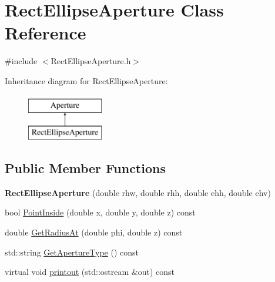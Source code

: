 \hypertarget{classRectEllipseAperture}{}\section{Rect\+Ellipse\+Aperture Class Reference}
\label{classRectEllipseAperture}


{\ttfamily \#include $<$Rect\+Ellipse\+Aperture.\+h$>$}

Inheritance diagram for Rect\+Ellipse\+Aperture\+:\begin{figure}[H]
\begin{center}
\leavevmode
\includegraphics[height=2.000000cm]{classRectEllipseAperture}
\end{center}
\end{figure}
\subsection*{Public Member Functions}
\begin{DoxyCompactItemize}
\item 
\mbox{\label{classRectEllipseAperture_a806557895c0a3df2e4e6e5e6aa577c19}} 
{\bfseries Rect\+Ellipse\+Aperture} (double rhw, double rhh, double ehh, double ehv)
\item 
bool \hyperlink{classRectEllipseAperture_ac3cc7fae775b055d74ea185a77b08c7f}{Point\+Inside} (double x, double y, double z) const
\item 
double \hyperlink{classRectEllipseAperture_a3e6ea0e15b7a9f026bc7ead70efe5e18}{Get\+Radius\+At} (double phi, double z) const
\item 
std\+::string \hyperlink{classRectEllipseAperture_a983dec943872b82aa91f74cd10558207}{Get\+Aperture\+Type} () const
\item 
virtual void \hyperlink{classRectEllipseAperture_a13285bdfb9c849fe94cd261ae1bfffe4}{printout} (std\+::ostream \&out) const
\end{DoxyCompactItemize}
